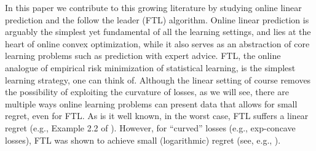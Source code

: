 \documentclass[english]{article}
\begin{document}
In this paper we contribute to this growing literature by studying online linear prediction and the follow the leader (FTL) algorithm.
Online linear prediction is arguably the simplest yet fundamental of all the learning settings, and lies at the heart of online
convex optimization, while it also serves as an abstraction of core learning problems such as prediction with expert advice.
FTL, the online analogue of empirical risk minimization of statistical learning, is the simplest learning strategy, one can think of.
Although the linear setting of course removes the possibility of exploiting the curvature of losses, as we will see, there are
multiple ways online learning problems can present data that allows for small regret, even for FTL.
As is it well known, in the worst case,
FTL suffers a linear regret (e.g., Example 2.2 of \citealt{SS12:Book}). 
However, for ``curved'' losses (e.g., exp-concave losses), FTL was shown to achieve small (logarithmic) regret
(see, e.g., \citealt{MF92,CBLu06:book,gaivoronski2000stochastic,hazan2007logarithmic}).
\end{document}
